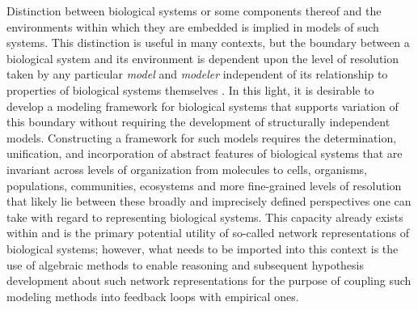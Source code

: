 \documentclass[aps,twocolumn]{revtex4-1}
\begin{document}
Distinction between biological systems or some components thereof and the environments within which they are embedded is implied in models of such systems. This distinction is useful in many contexts, but the boundary between a biological system and its environment is dependent upon the level of resolution taken by any particular \emph{model} and \emph{modeler} independent of its relationship to properties of biological systems themselves \cite{Fontana1996}. In this light, it is desirable to develop a modeling framework for biological systems that supports variation of this boundary without requiring the development of structurally independent models. Constructing a framework for such models requires the determination, unification, and incorporation of abstract features of biological systems that are invariant across levels of organization from molecules to cells, organisms, populations, communities, ecosystems and more fine-grained levels of resolution that likely lie between these broadly and imprecisely defined perspectives one can take with regard to representing biological systems. This capacity already exists within and is the primary potential utility of so-called network representations of biological systems; however, what needs to be imported into this context is the use of algebraic methods to enable reasoning and subsequent hypothesis development about such network representations for the purpose of coupling such modeling methods into feedback loops with empirical ones.
\end{document}
